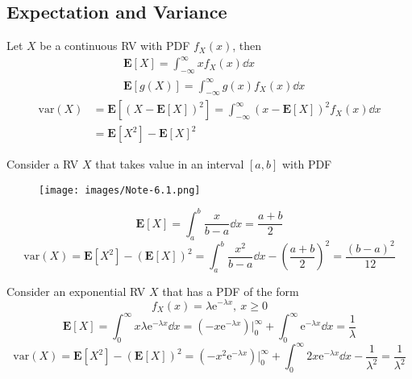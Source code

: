 \documentclass[device=normal, lang=en, fontsize=12pt]{elegantnote}
\numberwithin{equation}{section}
\theoremstyle{definition} %
\begin{document}
\subsection{Expectation and Variance}
\begin{definition}
    Let $X$ be a continuous RV with PDF $f_{X}(x)$, then
    \begin{equation}
    \begin{aligned}
        &\mathbf{E}[X] = \int_{-\infty}^{\infty} x f_{X}(x) \dd{x} \\ 
        &\mathbf{E}[g(X)] = \int_{-\infty}^{\infty} g(x) f_{X}(x) \dd{x}
    \end{aligned}
    \end{equation}
    \begin{equation}
    \begin{aligned}
        \text{var}(X) &= \mathbf{E}[(X - \mathbf{E}[X])^{2}] = \int_{-\infty}^{\infty} (x - \mathbf{E}[X])^{2} f_{X}(x) \dd{x} \\ 
        &= \mathbf{E}[X^{2}] - \mathbf{E}[X]^{2}
    \end{aligned}
    \end{equation}
\end{definition}
\begin{example}[Uniform RV]
    Consider a RV $X$ that takes value in an interval $[a, b]$ with PDF
    \begin{figure}[H]
        \centering
        \texttt{[image: images/Note-6.1.png]}
    \end{figure}
    \vspace{-2em}
    \begin{equation}
        \mathbf{E}[X] = \int_{a}^{b} \frac{x}{b - a} \dd{x} = \frac{a + b}{2}
    \end{equation}
    \begin{equation}
        \text{var}(X) = \mathbf{E}[X^2] - (\mathbf{E}[X])^2 = \int_{a}^{b} \frac{x^2}{b - a} \dd{x} - \left(\frac{a + b}{2}\right)^2 = \frac{(b - a)^2}{12}
    \end{equation}
\end{example}
\begin{example}[Exponential RV]
    Consider an exponential RV $X$ that has a PDF of the form
    \begin{equation}
        f_{X}(x) = \lambda \mathrm{e}^{-\lambda x},~ x \geq 0
    \end{equation}
    \begin{equation}
        \mathbf{E}[X] = \int_{0}^{\infty} x \lambda \mathrm{e}^{-\lambda x} \dd{x} = (-x \mathrm{e}^{-\lambda x}) \Big|_{0}^{\infty} + \int_{0}^{\infty} \mathrm{e}^{-\lambda x} \dd{x} = \frac{1}{\lambda}
    \end{equation}
    \begin{equation}
        \text{var}(X) = \mathbf{E}[X^2] - (\mathbf{E}[X])^2 = (-x^2 \mathrm{e}^{-\lambda x}) \Big|_{0}^{\infty} + \int_{0}^{\infty} 2x \mathrm{e}^{-\lambda x} \dd{x} - \frac{1}{\lambda^2} = \frac{1}{\lambda^2}
    \end{equation}
\end{example}
\end{document}

